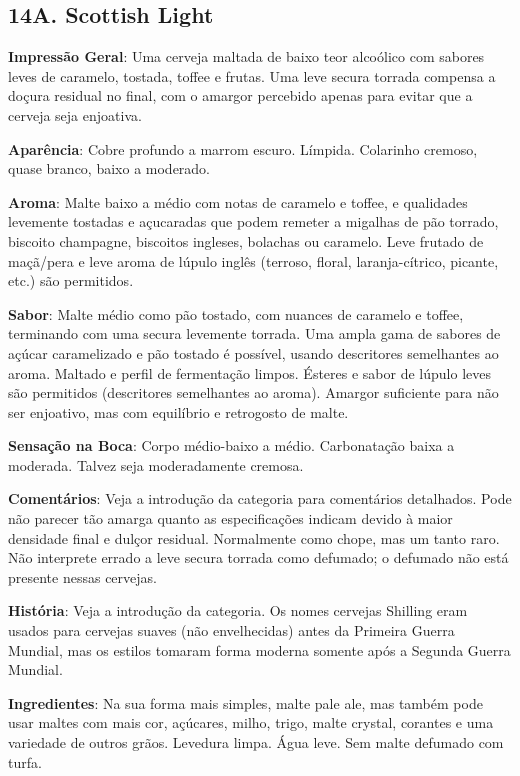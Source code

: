 \subsection*{14A. Scottish Light}
\textbf{Impressão Geral}: Uma cerveja maltada de baixo teor alcoólico com sabores leves de caramelo, tostada, toffee e frutas. Uma leve secura torrada compensa a doçura residual no final, com o amargor percebido apenas para evitar que a cerveja seja enjoativa.

\textbf{Aparência}: Cobre profundo a marrom escuro. Límpida. Colarinho cremoso, quase branco, baixo a moderado.

\textbf{Aroma}: Malte baixo a médio com notas de caramelo e toffee, e qualidades levemente tostadas e açucaradas que podem remeter a migalhas de pão torrado, biscoito champagne, biscoitos ingleses, bolachas ou caramelo. Leve frutado de maçã/pera e leve aroma de lúpulo inglês (terroso, floral, laranja-cítrico, picante, etc.) são permitidos.

\textbf{Sabor}: Malte médio como pão tostado, com nuances de caramelo e toffee, terminando com uma secura levemente torrada. Uma ampla gama de sabores de açúcar caramelizado e pão tostado é possível, usando descritores semelhantes ao aroma. Maltado e perfil de fermentação limpos. Ésteres e sabor de lúpulo leves são permitidos (descritores semelhantes ao aroma). Amargor suficiente para não ser enjoativo, mas com equilíbrio e retrogosto de malte.

\textbf{Sensação na Boca}: Corpo médio-baixo a médio. Carbonatação baixa a moderada. Talvez seja moderadamente cremosa.

\textbf{Comentários}: Veja a introdução da categoria para comentários detalhados. Pode não parecer tão amarga quanto as especificações indicam devido à maior densidade final e dulçor residual. Normalmente como chope, mas um tanto raro. Não interprete errado a leve secura torrada como defumado; o defumado não está presente nessas cervejas.

\textbf{História}: Veja a introdução da categoria. Os nomes cervejas Shilling eram usados para cervejas suaves (não envelhecidas) antes da Primeira Guerra Mundial, mas os estilos tomaram forma moderna somente após a Segunda Guerra Mundial.

\textbf{Ingredientes}: Na sua forma mais simples, malte pale ale, mas também pode usar maltes com mais cor, açúcares, milho, trigo, malte crystal, corantes e uma variedade de outros grãos. Levedura limpa. Água leve. Sem malte defumado com turfa.

